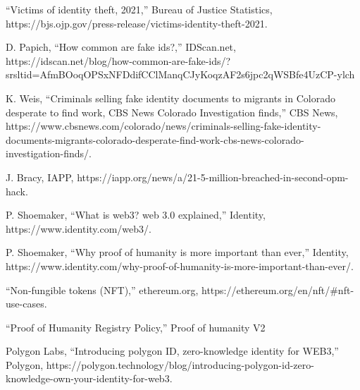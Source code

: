 \documentclass[conference]{IEEEtran}
\begin{document}
\begin{thebibliography}{00}
“Victims of identity theft, 2021,” Bureau of Justice Statistics, https://bjs.ojp.gov/press-release/victims-identity-theft-2021. 

D. Papich, “How common are fake ids?,” IDScan.net,
https://idscan.net/blog/how-common-are-fake-ids/?srsltid=AfmBOoqOPSxNFDdifCClManqCJyKoqzAF2s6jpc2qWSBfe4UzCP-ylch

K. Weis, “Criminals selling fake identity documents to migrants in Colorado desperate to find work, CBS News Colorado Investigation finds,” CBS News, https://www.cbsnews.com/colorado/news/criminals-selling-fake-identity-documents-migrants-colorado-desperate-find-work-cbs-news-colorado-investigation-finds/. 

J. Bracy, IAPP, https://iapp.org/news/a/21-5-million-breached-in-second-opm-hack. 

P. Shoemaker, “What is web3? web 3.0 explained,” Identity, https://www.identity.com/web3/.

P. Shoemaker, “Why proof of humanity is more important than ever,” Identity, https://www.identity.com/why-proof-of-humanity-is-more-important-than-ever/.

“Non-fungible tokens (NFT),” ethereum.org, https://ethereum.org/en/nft/#nft-use-cases.

“Proof of Humanity Registry Policy,” Proof of humanity V2

Polygon Labs, “Introducing polygon ID, zero-knowledge identity for WEB3,” Polygon, https://polygon.technology/blog/introducing-polygon-id-zero-knowledge-own-your-identity-for-web3. 

\end{thebibliography}
\end{document}
